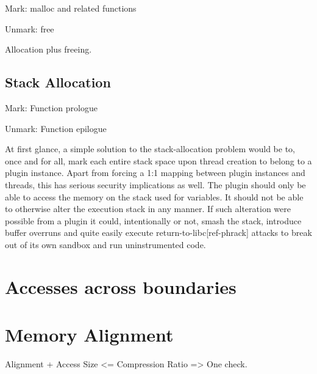 Mark: malloc and related functions

Unmark: free

Allocation plus freeing.

\subsection {Stack Allocation}

Mark: Function prologue

Unmark: Function epilogue

At first glance, a simple solution to the stack-allocation problem would be to,
once and for all, mark each entire stack space upon thread creation to belong to
a plugin instance. Apart from forcing a 1:1 mapping between plugin instances and
threads, this has serious security implications as well. The plugin should only
be able to access the memory on the stack used for variables. It should not be
able to otherwise alter the execution stack in any manner. If such alteration
were possible from a plugin it could, intentionally or not, smash the stack,
introduce buffer overruns and quite easily execute return-to-libc[ref-phrack]
attacks to break out of its own sandbox and run uninstrumented code.


\section {Accesses across boundaries}


\section {Memory Alignment}

Alignment + Access Size <= Compression Ratio => One check.


